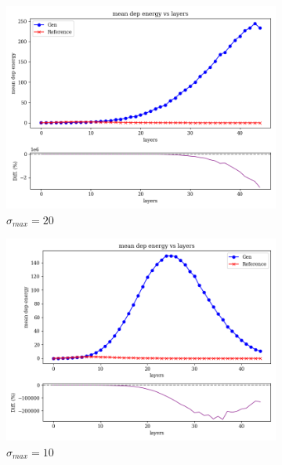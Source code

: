 \begin{figure}[bthp]
    \centering
    \begin{subfigure}[b]{0.23\textwidth}
        \centering
        \includegraphics[width=\textwidth]{Figures/vp20_3.png}
        \caption{$\sigma_{max}=20$}
        \label{fig:vp20_3}
    \end{subfigure}
    \hfill
    \begin{subfigure}[b]{0.23\textwidth}
        \centering
        \includegraphics[width=\textwidth]{Figures/vp10_3.png}
        \caption{$\sigma_{max}=10$}
        \label{fig:vp10_3}
    \end{subfigure}
    \hfill
    \begin{subfigure}[b]{0.23\textwidth}

\end{subfigure}
\end{figure}
